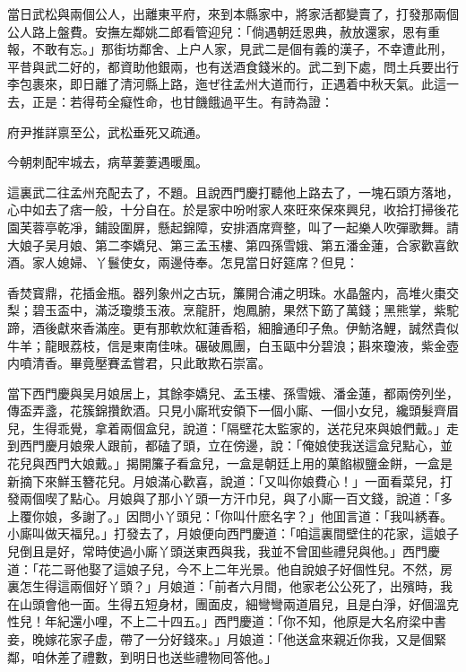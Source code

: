 當日武松與兩個公人，出離東平府，來到本縣家中，將家活都變賣了，打發那兩個公人路上盤費。安撫左鄰姚二郎看管迎兒：「倘遇朝廷恩典，赦放還家，恩有重報，不敢有忘。」那街坊鄰舍、上户人家，見武二是個有義的漢子，不幸遭此刑，平昔與武二好的，都資助他銀兩，也有送酒食錢米的。武二到下處，問土兵要出行李包裹來，即日離了清河縣上路，迤ぜ往孟州大道而行，正遇着中秋天氣。此這一去，正是：若得苟全癡性命，也甘饑餓過平生。有詩為證：

\begin{myquote}
府尹推詳禀至公，武松垂死又疏通。

今朝刺配牢城去，病草萋萋遇暖風。
\end{myquote}

這裏武二往孟州充配去了，不題。且說西門慶打聽他上路去了，一塊石頭方落地，心中如去了痞一般，十分自在。於是家中吩咐家人來旺來保來興兒，收拾打掃後花園芙蓉亭乾凈，鋪設圍屏，懸起錦障，安排酒席齊整，叫了一起樂人吹彈歌舞。請大娘子吴月娘、第二李嬌兒、第三孟玉樓、第四孫雪娥、第五潘金蓮，合家歡喜飲酒。家人媳婦、丫鬟使女，兩邊侍奉。怎見當日好筵席？但見：
\begin{myquote}
香焚寳鼎，花插金瓶。器列象州之古玩，簾開合浦之明珠。水晶盤内，高堆火棗交梨；碧玉盃中，滿泛瓊漿玉液。烹龍肝，炮鳳腑，果然下筯了萬錢；黑熊掌，紫駝蹄，酒後獻來香滿座。更有那軟炊紅蓮香稻，細膾通印子魚。伊魴洛鯉，誠然貴似牛羊；龍眼荔枝，信是東南佳味。碾破鳳團，白玉甌中分碧浪；斟來瓊液，紫金壺内噴清香。畢竟壓賽孟嘗君，只此敢欺石崇富。
\end{myquote}

當下西門慶與吴月娘居上，其餘李嬌兒、孟玉樓、孫雪娥、潘金蓮，都兩傍列坐，傳盃弄盞，花簇錦攢飲酒。只見小廝玳安領下一個小廝、一個小女兒，纔頭髮齊眉兒，生得乖覺，拿着兩個盒兒，說道：「隔壁花太監家的，送花兒來與娘們戴。」走到西門慶月娘衆人跟前，都磕了頭，立在傍邊，說：「俺娘使我送這盒兒點心，並花兒與西門大娘戴。」揭開簾子看盒兒，一盒是朝廷上用的菓餡椒鹽金餅，一盒是新摘下來鮮玉簪花兒。月娘滿心歡喜，說道：「又叫你娘費心！」一面看菜兒，打發兩個喫了點心。月娘與了那小丫頭一方汗巾兒，與了小廝一百文錢，說道：「多上覆你娘，多謝了。」因問小丫頭兒：「你叫什麽名字？」他囬言道：「我叫綉春。小廝叫做天福兒。」打發去了，月娘便向西門慶道：「咱這裏間壁住的花家，這娘子兒倒且是好，常時使過小廝丫頭送東西與我，我並不曾囬些禮兒與他。」西門慶道：「花二哥他娶了這娘子兒，今不上二年光景。他自說娘子好個性兒。不然，房裏怎生得這兩個好丫頭？」月娘道：「前者六月間，他家老公公死了，出殯時，我在山頭會他一面。生得五短身材，團面皮，細彎彎兩道眉兒，且是白淨，好個溫克性兒！年紀還小哩，不上二十四五。」西門慶道：「你不知，他原是大名府梁中書妾，晚嫁花家子虚，帶了一分好錢來。」月娘道：「他送盒來親近你我，又是個緊鄰，咱休差了禮數，到明日也送些禮物囘答他。」

